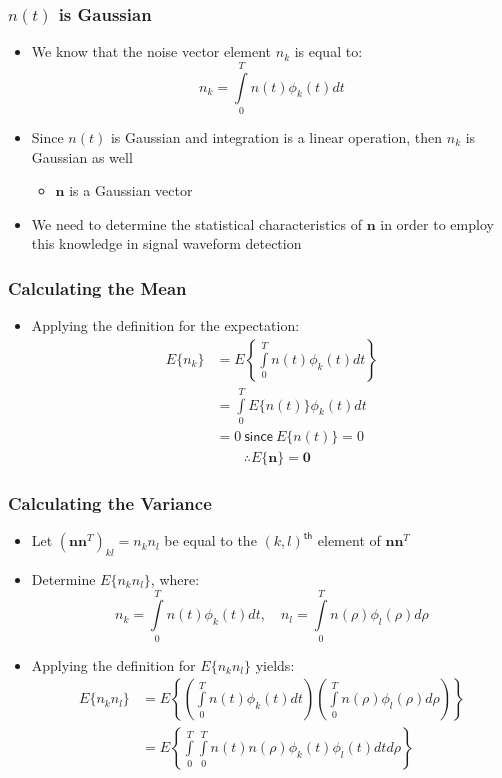 \documentclass[10pt]{beamer}
\begin{document}
\frame
{
  \frametitle{$n(t)$ is Gaussian}
  
  \begin{itemize}
    \item We know that the noise vector element $n_k$ is equal to:
    \begin{equation}
        n_k=\int\limits_{0}^{T}n(t)\phi_k(t)dt
    \end{equation}
    \item Since $n(t)$ is Gaussian and integration is a linear operation, then $n_k$ is Gaussian as well
    \begin{itemize}
        \item $\mathbf{n}$ is a Gaussian vector
    \end{itemize}
    \item We need to determine the statistical characteristics of $\mathbf{n}$ in order to employ this knowledge in signal waveform detection
  \end{itemize}

}
\frame
{
  \frametitle{Calculating the Mean}

  \begin{itemize}
    \item Applying the definition for the expectation:
    \begin{equation}
    \begin{split}
        E\{n_k\}&=E\left\{\int\limits_0^Tn(t)\phi_k(t)dt\right\}\\
        &=\int\limits_0^TE\{n(t)\}\phi_k(t)dt\\
        &=0~\mathsf{since}~E\{n(t)\}=0\\
        &\qquad\therefore{E\{\mathbf{n}\}=\mathbf{0}}\nonumber
    \end{split}
    \end{equation}
  \end{itemize}

}
\frame
{
  \frametitle{Calculating the Variance}

  \begin{itemize}
    \item Let $(\mathbf{n}\mathbf{n}^T)_{kl}=n_kn_l$ be equal to the $(k,l)^\mathsf{th}$ element of $\mathbf{n}\mathbf{n}^T$
    \item Determine $E\{n_kn_l\}$, where:
    \begin{equation}
        n_k=\int\limits_0^Tn(t)\phi_k(t)dt,\quad n_l=\int\limits_0^Tn(\rho)\phi_l(\rho)d\rho\nonumber
    \end{equation}
    \item Applying the definition for $E\{n_kn_l\}$ yields:
    \begin{equation}
    \begin{split}
        E\{n_kn_l\}&=E\left\{\left(\int\limits_0^Tn(t)\phi_k(t)dt\right)\left(\int\limits_0^Tn(\rho)\phi_l(\rho)d\rho\right)\right\}\\
        &=E\left\{\int\limits_0^T\int\limits_0^Tn(t)n(\rho)\phi_k(t)\phi_l(t)dtd\rho\right\}\nonumber
    \end{split}
    \end{equation}
  \end{itemize}
  
}
\end{document}
